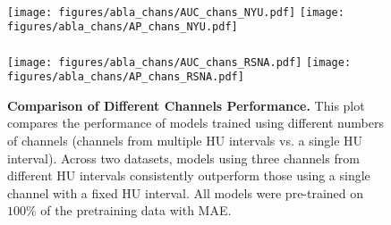 \begin{figure}[!htpb]
    \centering
     \\[0.2cm]
    \texttt{[image: figures/abla\_chans/AUC\_chans\_NYU.pdf]}
    \texttt{[image: figures/abla\_chans/AP\_chans\_NYU.pdf]}\\
     \\[0.2cm]
    \texttt{[image: figures/abla\_chans/AUC\_chans\_RSNA.pdf]}
    \texttt{[image: figures/abla\_chans/AP\_chans\_RSNA.pdf]} 
    \caption{\textbf{Comparison of Different Channels Performance.} This plot compares the performance of models trained using different numbers of channels (channels from multiple HU intervals vs. a single HU interval). Across two datasets, models using three channels from different HU intervals consistently outperform those using a single channel with a fixed HU interval. All models were pre-trained on $100\%$ of the pretraining data with MAE.}
    \label{fig:channels-ablation}
\end{figure}
